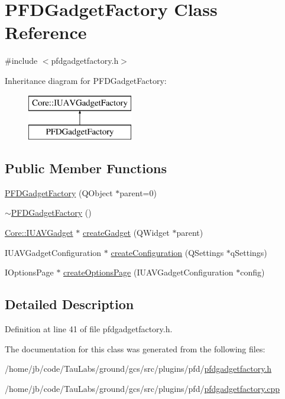 \hypertarget{class_p_f_d_gadget_factory}{\section{\-P\-F\-D\-Gadget\-Factory \-Class \-Reference}
\label{class_p_f_d_gadget_factory}
}


{\ttfamily \#include $<$pfdgadgetfactory.\-h$>$}

\-Inheritance diagram for \-P\-F\-D\-Gadget\-Factory\-:\begin{figure}[H]
\begin{center}
\leavevmode
\includegraphics[height=2.000000cm]{class_p_f_d_gadget_factory}
\end{center}
\end{figure}
\subsection*{\-Public \-Member \-Functions}
\begin{DoxyCompactItemize}
\item 
\hyperlink{group___p_f_d_plugin_ga3c6dc1d198abb5039a6eae8378445ce8}{\-P\-F\-D\-Gadget\-Factory} (\-Q\-Object $\ast$parent=0)
\item 
\hyperlink{group___p_f_d_plugin_ga56df1b4bb10efeda677e12cab72651a1}{$\sim$\-P\-F\-D\-Gadget\-Factory} ()
\item 
\hyperlink{class_core_1_1_i_u_a_v_gadget}{\-Core\-::\-I\-U\-A\-V\-Gadget} $\ast$ \hyperlink{group___p_f_d_plugin_gaabdf0c7b16f184f5e8c2ca4dd1a8b6d0}{create\-Gadget} (\-Q\-Widget $\ast$parent)
\item 
\-I\-U\-A\-V\-Gadget\-Configuration $\ast$ \hyperlink{group___p_f_d_plugin_gab815256ffa03ff2447c6be5a1d56e1ab}{create\-Configuration} (\-Q\-Settings $\ast$q\-Settings)
\item 
\-I\-Options\-Page $\ast$ \hyperlink{group___p_f_d_plugin_ga74a3922aa2b3e3524dc1969c65f4bf07}{create\-Options\-Page} (\-I\-U\-A\-V\-Gadget\-Configuration $\ast$config)
\end{DoxyCompactItemize}


\subsection{\-Detailed \-Description}


\-Definition at line 41 of file pfdgadgetfactory.\-h.



\-The documentation for this class was generated from the following files\-:\begin{DoxyCompactItemize}
\item 
/home/jb/code/\-Tau\-Labs/ground/gcs/src/plugins/pfd/\hyperlink{pfdgadgetfactory_8h}{pfdgadgetfactory.\-h}\item 
/home/jb/code/\-Tau\-Labs/ground/gcs/src/plugins/pfd/\hyperlink{pfdgadgetfactory_8cpp}{pfdgadgetfactory.\-cpp}\end{DoxyCompactItemize}
